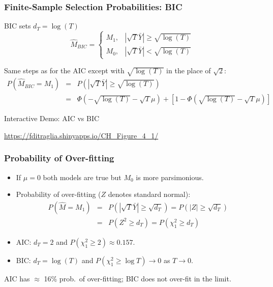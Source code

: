 \begin{frame}
  \frametitle{Finite-Sample Selection Probabilities: BIC}

  \begin{block}{BIC sets $d_T = \log(T)$}
	$$\widehat{M}_{BIC} = \left\{\begin{array}
		{cc} M_1, & |\sqrt{T}\bar{Y} | \geq \sqrt{\log(T)} \\
		M_0, & |\sqrt{T} \bar{Y}| < \sqrt{\log(T)}
	\end{array} \right.$$
  \end{block}
Same steps as for the AIC except with $\sqrt{\log(T)}$ in the place of $\sqrt{2}$:
\footnotesize
	\begin{eqnarray*}
		P\left(\widehat{M}_{BIC} = M_1\right) &=& P\left(\left|\sqrt{T}\bar{Y} \right| \geq \sqrt{\log(T)}  \right)\\
			&=& \Phi\left(-\sqrt{\log(T)} - \sqrt{T}\mu\right) + \left[1 -  \Phi\left(\sqrt{\log(T)} - \sqrt{T} \mu \right)\right]
	\end{eqnarray*}

  \begin{block}{Interactive Demo: AIC vs BIC}

\url{https://fditraglia.shinyapps.io/CH\_Figure\_4\_1/}
  \end{block}
\end{frame}
\begin{frame}
  \frametitle{Probability of Over-fitting}

  \small

  \begin{itemize}
    \item If $\mu = 0$ both models are true but $M_0$ is more parsimonious. 
    \item Probability of over-fitting ($Z$ denotes standard normal): 
\begin{eqnarray*}
	P\left(\widehat{M} = M_1\right) &=& P\left(|\sqrt{T}\bar{Y}|\geq \sqrt{d_T}\right) = P(|Z|\geq \sqrt{d_T})\\
	 &=& P(Z^2 \geq d_T) = P(\chi^2_1 \geq d_T)
\end{eqnarray*}
\item AIC: $d_T = 2$ and $P(\chi^2_1 \geq 2)\approx 0.157$.  
\item BIC: $d_T = \log(T)$ and $P(\chi^2_1 \geq \log T) \rightarrow 0$ as $T\rightarrow 0$.
  \end{itemize}

  \alert{AIC has $\approx$ 16\% prob.\ of over-fitting; BIC does not over-fit in the limit.}

\end{frame}

